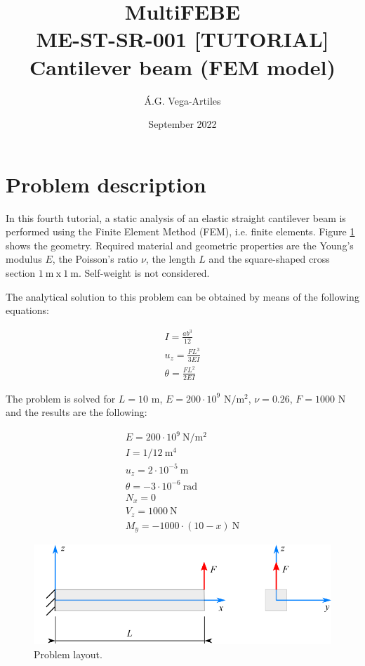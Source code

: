 \documentclass[a4]{article}
\title{MultiFEBE \\ ME-ST-SR-001 [TUTORIAL] \\ Cantilever beam (FEM model)}
\author{\'A.G. Vega-Artiles}
\date{September 2022}
\begin{document}
\maketitle

\tableofcontents 

\section{Problem description}

In this fourth tutorial, a static analysis of an elastic straight cantilever beam is performed using the Finite Element Method (FEM), i.e. finite elements. Figure \ref{fig:beam} shows the geometry. Required material and geometric properties are the Young's modulus $E$, the Poisson's ratio $\nu$, the length $L$ and the square-shaped cross section $1 \medspace \mathrm{m} \medspace \mathrm{x} \medspace 1 \medspace \mathrm{m}$. Self-weight is not considered. 

The analytical solution to this problem can be obtained by means of the following equations:

\begin{equation}
	\begin{array}{l}
		I = \frac{ab^3}{12} \\
		u_z = \frac{FL^3}{3EI} \\
		\theta = \frac{FL^2}{2EI}
	\end{array}
\end{equation}

The problem is solved for $L=10$ $\mathrm{m}$, $E=200\cdot 10^9$ $\mathrm{N/m^2}$, $\nu=0.26$, $F=1000$ $\mathrm{N}$ and the results are the following: 

\begin{equation}
	\begin{array}{l}
		E = 200\cdot 10^9 \medspace \mathrm{N/m^2} \\
		I = 1/12 \medspace \mathrm{m^4} \\
		u_z = 2\cdot 10^{-5} \medspace \mathrm{m}\\
		\theta =  -3\cdot 10^{-6} \medspace \mathrm{rad}\\
		N_{x} = 0\\
		V_{z} = 1000 \medspace \mathrm{N}\\
		M_{y} = -1000\cdot(10-x)\medspace \mathrm{N}
	\end{array}
\end{equation}

\begin{figure}[h]
	\centering
	\includegraphics{beam.pdf}
	\caption{Problem layout.}
	\label{fig:beam}
\end{figure}
\end{document}
